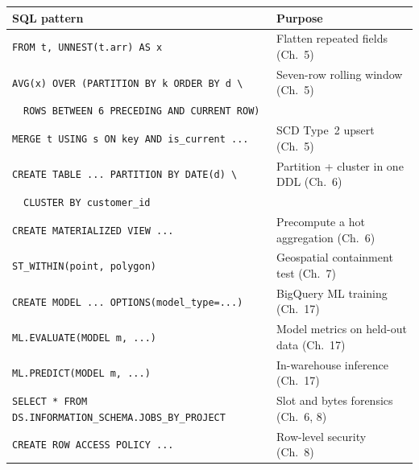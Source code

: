\begin{center}
\footnotesize
\begin{tabular}{@{}p{6.6cm}p{6.2cm}@{}}
\toprule
\textbf{SQL pattern} & \textbf{Purpose} \\
\midrule
\texttt{FROM t, UNNEST(t.arr) AS x} & Flatten repeated fields (Ch.~5) \\
\texttt{AVG(x) OVER (PARTITION BY k ORDER BY d \textbackslash} & Seven-row rolling window (Ch.~5) \\
~~\texttt{ROWS BETWEEN 6 PRECEDING AND CURRENT ROW)} & \\
\texttt{MERGE t USING s ON key AND is\_current ...} & SCD Type~2 upsert (Ch.~5) \\
\texttt{CREATE TABLE ... PARTITION BY DATE(d) \textbackslash} & Partition + cluster in one DDL (Ch.~6) \\
~~\texttt{CLUSTER BY customer\_id} & \\
\texttt{CREATE MATERIALIZED VIEW ...} & Precompute a hot aggregation (Ch.~6) \\
\texttt{ST\_WITHIN(point, polygon)} & Geospatial containment test (Ch.~7) \\
\texttt{CREATE MODEL ... OPTIONS(model\_type=...)} & BigQuery ML training (Ch.~17) \\
\texttt{ML.EVALUATE(MODEL m, ...)} & Model metrics on held-out data (Ch.~17) \\
\texttt{ML.PREDICT(MODEL m, ...)} & In-warehouse inference (Ch.~17) \\
\texttt{SELECT * FROM DS.INFORMATION\_SCHEMA.JOBS\_BY\_PROJECT} & Slot and bytes forensics (Ch.~6, 8) \\
\texttt{CREATE ROW ACCESS POLICY ...} & Row-level security (Ch.~8) \\
\bottomrule
\end{tabular}
\end{center}

